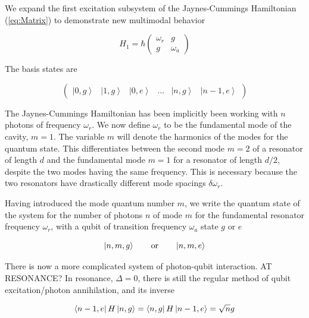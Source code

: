 \documentclass[12 pt]{book}
\newcommand{\ket}[1]{\left| #1 \right>} %
\newcommand{\matrixel}[3]{\left< #1 \vphantom{#2#3} \right|
 #2 \left| #3 \vphantom{#1#2} \right>} %
\begin{document}
We expand the first excitation subsystem of the Jaynes-Cummings Hamiltonian (\ref{eq:Matrix}) to demonstrate new multimodal behavior

\begin{equation}\label{eq:Matrix}
H_1 =  \hbar\left(\begin{array}{cc}
\omega_r 	& g \\
g    		& \omega_a 
\end{array} \right)
\end{equation}

The basis states are

\begin{equation}
\left(\begin{array}{cccccc} \ket{0,g} & \ket{1,g} & \ket{0,e} & ... & \ket{n, g} & \ket{n-1,e}
\end{array}\right)
\end{equation}

The Jaynes-Cummings Hamiltonian has been implicitly been working with $n$ photons of frequency $\omega_r$. We now define $\omega_r$ to be the fundamental mode of the cavity, $m=1$. The variable $m$ will denote the harmonics of the modes for the quantum state. This differentiates between the second mode $m=2$ of a resonator of length $d$ and the fundamental mode $m=1$ for a resonator of length $d/2$, despite the two modes having the same frequency. This is necessary because the two resonators have drastically different mode spacings $\delta\omega_r$. 

Having introduced the mode quantum number $m$, we write the quantum state of the system for the number of photons $n$ of mode $m$ for the fundamental resonator frequency $\omega_r$, with a qubit of transition frequency $\omega_a$ state $g$ or $e$

\begin{equation}
\ket{n,m,g} \hspace{0.7cm} \mathrm{or} \hspace{0.7cm} \ket{n,m,e}
\end{equation}

There is now a more complicated system of photon-qubit interaction. AT RESONANCE? In resonance, $\Delta=0$, there is still the regular method of qubit excitation/photon annihilation, and its inverse

\begin{equation}
\matrixel{n-1,e}{H}{n,g} =\matrixel{n,g}{H}{n-1,e} =\sqrt{n}g
\end{equation}
\end{document}
